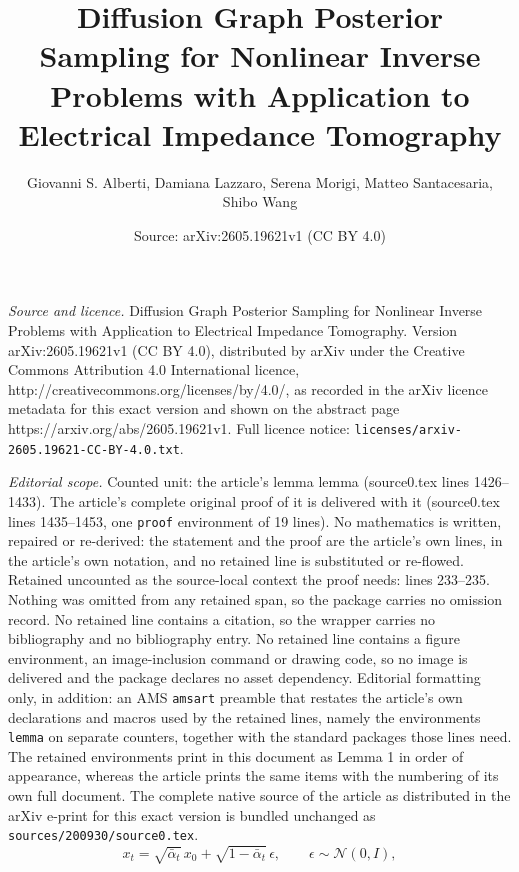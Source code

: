 \documentclass[10pt,a4paper]{amsart}
\title{Diffusion Graph Posterior Sampling for Nonlinear Inverse Problems with Application to Electrical Impedance Tomography}
\author{Giovanni S. Alberti, Damiana Lazzaro, Serena Morigi, Matteo Santacesaria, Shibo Wang}
\date{Source: arXiv:2605.19621v1 (CC BY 4.0)}
\renewcommand{\varepsilon}{\epsilon}
\begin{document}
\maketitle

\noindent\emph{Source and licence.} Diffusion Graph Posterior Sampling for Nonlinear Inverse Problems with Application to Electrical Impedance Tomography. Version arXiv:2605.19621v1 (CC BY 4.0), distributed by arXiv under the Creative Commons Attribution 4.0 International licence, http://creativecommons.org/licenses/by/4.0/, as recorded in the arXiv licence metadata for this exact version and shown on the abstract page https://arxiv.org/abs/2605.19621v1. Full licence notice: \texttt{licenses/arxiv-2605.19621-CC-BY-4.0.txt}.\par\smallskip

\noindent\textit{Editorial scope.} Counted unit: the article's lemma lemma (source0.tex lines 1426--1433). The article's complete original proof of it is delivered with it (source0.tex lines 1435--1453, one \texttt{proof} environment of 19 lines). No mathematics is written, repaired or re-derived: the statement and the proof are the article's own lines, in the article's own notation, and no retained line is substituted or re-flowed.  Retained uncounted as the source-local context the proof needs: lines 233--235.  Nothing was omitted from any retained span, so the package carries no omission record.  No retained line contains a citation, so the wrapper carries no bibliography and no bibliography entry.  No retained line contains a figure environment, an image-inclusion command or drawing code, so no image is delivered and the package declares no asset dependency.  Editorial formatting only, in addition: an AMS \texttt{amsart} preamble that restates the article's own declarations and macros used by the retained lines, namely the environments \texttt{lemma} on separate counters, together with the standard packages those lines need.  The retained environments print in this document as Lemma 1 in order of appearance, whereas the article prints the same items with the numbering of its own full document.  The complete native source of the article as distributed in the arXiv e-print for this exact version is bundled unchanged as \texttt{sources/200930/source0.tex}.
\begin{equation} \label{eq:forward_diffusion_closed}
    x_t = \sqrt{\bar\alpha_t}\,x_0 + \sqrt{1-\bar\alpha_t}\,\varepsilon, \qquad \varepsilon \sim \mathcal{N}(0,I),
\end{equation}
\end{document}
